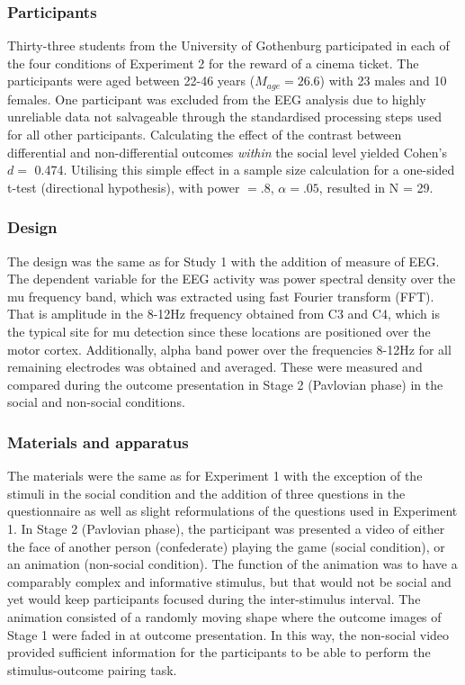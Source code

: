 \documentclass[]{elsarticle} %
\begin{document}
\hypertarget{participants-1}{%
\subsubsection{Participants}\label{participants-1}}

Thirty-three students from the University of Gothenburg participated in
each of the four conditions of Experiment 2 for the reward of a cinema
ticket. The participants were aged between 22-46 years
(\(M_{age} = 26.6\)) with 23 males and 10 females. One participant was
excluded from the EEG analysis due to highly unreliable data not
salvageable through the standardised processing steps used for all other
participants. Calculating the effect of the contrast between
differential and non-differential outcomes \emph{within} the social
level yielded Cohen's \(d=\) 0.474. Utilising this simple effect in a
sample size calculation for a one-sided t-test (directional hypothesis),
with power \(= .8\), \(\alpha = .05\), resulted in N = 29.

\hypertarget{design-1}{%
\subsubsection{Design}\label{design-1}}

The design was the same as for Study 1 with the addition of measure of
EEG. The dependent variable for the EEG activity was power spectral
density over the mu frequency band, which was extracted using fast
Fourier transform (FFT). That is amplitude in the 8-12Hz frequency
obtained from C3 and C4, which is the typical site for mu detection
since these locations are positioned over the motor cortex.
Additionally, alpha band power over the frequencies 8-12Hz for all
remaining electrodes was obtained and averaged. These were measured and
compared during the outcome presentation in Stage 2 (Pavlovian phase) in
the social and non-social conditions.

\hypertarget{materials-and-apparatus-1}{%
\subsubsection{Materials and
apparatus}\label{materials-and-apparatus-1}}

The materials were the same as for Experiment 1 with the exception of
the stimuli in the social condition and the addition of three questions
in the questionnaire as well as slight reformulations of the questions
used in Experiment 1. In Stage 2 (Pavlovian phase), the participant was
presented a video of either the face of another person (confederate)
playing the game (social condition), or an animation (non-social
condition). The function of the animation was to have a comparably
complex and informative stimulus, but that would not be social and yet
would keep participants focused during the inter-stimulus interval. The
animation consisted of a randomly moving shape where the outcome images
of Stage 1 were faded in at outcome presentation. In this way, the
non-social video provided sufficient information for the participants to
be able to perform the stimulus-outcome pairing task.
\end{document}
